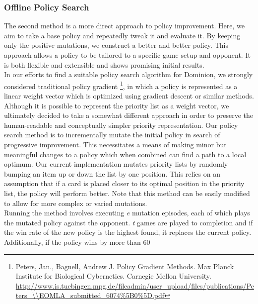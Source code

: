 \documentclass{article}
\begin{document}
\subsubsection{Offline Policy Search}
  The second method is a more direct approach to policy improvement. Here, we aim to take a base policy and repeatedly tweak it and evaluate it. By keeping only the positive mutations, we construct a better and better policy.
This approach allows a policy to be tailored to a specific game setup and opponent. It is both flexible and extensible and shows promising initial results.
\\
In our efforts to find a suitable policy search algorithm for Dominion, we strongly considered traditional policy gradient \footnote{Peters, Jan., Bagnell, Andrew J. Policy Gradient Methods. Max Planck Institute for Biological Cybernetics. Carnegie Mellon University.\\ \url{http://www.is.tuebingen.mpg.de/fileadmin/user\_upload/files/publications/Peters\_\\EOMLA\_submitted\_6074\%5B0\%5D.pdf}}, in which a policy is represented as a linear weight vector which is optimized using gradient descent or similar methods. Although it is possible to represent the priority list as a weight vector, we ultimately decided to take a somewhat different approach in order to preserve the human-readable and conceptually simpler priority representation.
Our policy search method is to incrementally mutate the initial policy in search of progressive improvement. This necessitates a means of making minor but meaningful changes to a policy which when combined can find a path to a local optimum. Our current implementation mutates priority lists by randomly bumping an item up or down the list by one position. This relies on an assumption that if a card is placed closer to its optimal position in the priority list, the policy will perform better. Note that this method can be easily modified to allow for more complex or varied mutations.
  \\Running the method involves executing \textit{e} mutation episodes, each of which plays the mutated policy against the opponent. \textit{t} games are played to completion and if the win rate of the new policy is the highest found, it replaces the current policy. Additionally, if the policy wins by more than 60%
\end{document}
